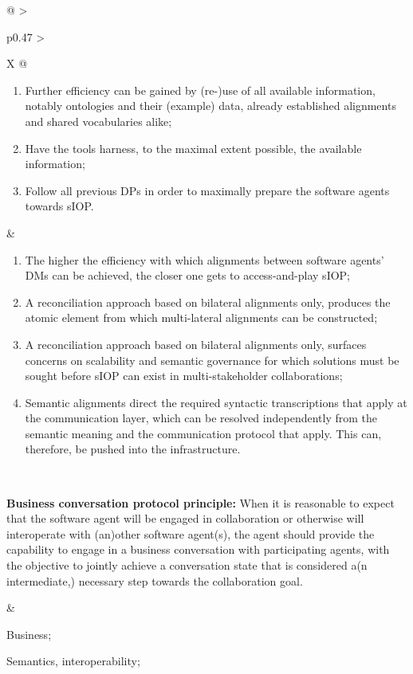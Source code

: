\begin{xltabular}[l]{\linewidth}{@{} >{\small\raggedright\arraybackslash}p{0.47\linewidth} >{\small\raggedright\arraybackslash}X @{}}
\begin{enumerate}[left=6pt, nosep]
  \item Further efficiency can be gained by (re-)use of all available information, notably ontologies and their (example) data, already established alignments and shared vocabularies alike;
  \item Have the tools harness, to the maximal extent possible, the available information;
  \item Follow all previous DPs in order to maximally prepare the software agents towards sIOP.
\end{enumerate}
&
\begin{enumerate}[left=10pt, nosep]
  \item The higher the efficiency with which alignments between software agents' DMs can be achieved, the closer one gets to access-and-play sIOP;
  \item A reconciliation approach based on bilateral alignments only, produces the atomic element from which multi-lateral alignments can be constructed;
  \item A reconciliation approach based on bilateral alignments only, surfaces concerns on scalability and semantic governance for which solutions must be sought before sIOP can exist in multi-stakeholder collaborations;
  \item Semantic alignments direct the required syntactic transcriptions that apply at the communication layer, which can be resolved independently from the semantic meaning and the communication protocol that apply. This can, therefore, be pushed into the infrastructure.
\end{enumerate} \\
%
%
%
\begin{mmdp}\label{dp:bcpp}{\bfseries Business conversation protocol principle:}
\quad When it is reasonable to expect that the software agent will be engaged in collaboration or otherwise will interoperate with (an)other software agent(s), the agent should provide the capability to engage in a business conversation with participating agents, with the objective to jointly achieve a conversation state that is considered a(n intermediate,) necessary step towards the collaboration goal.
\end{mmdp}
&
\begin{description}[labelwidth=3.7cm,leftmargin=3.7cm+1ex,nosep,topsep=2ex,labelsep=1ex,font=\bfseries]
  \item[Type of information:] Business;
  \item[Quality attributes:] Semantics, interoperability;

\end{description}
\end{xltabular}
